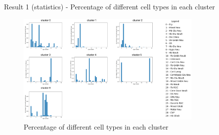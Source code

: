 \documentclass{beamer}
\begin{document}
\begin{frame}{Result 1 (statistics) - Percentage of different cell types in each cluster}

\begin{figure}
    \centering
    \includegraphics[width=0.8\textwidth]{type_p_clusters2.png}
    \caption{Percentage of different cell types in each cluster}
\end{figure} 

\end{frame}
\end{document}

